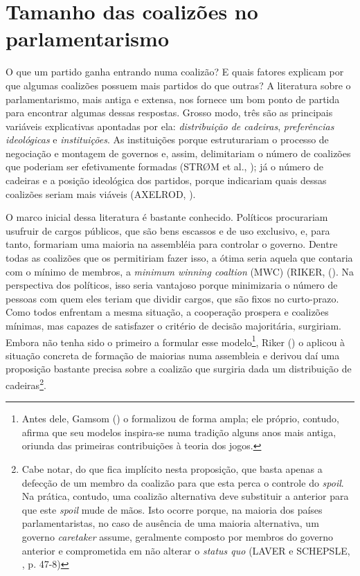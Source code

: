 \section{Tamanho das coalizões no parlamentarismo}

O que um partido ganha entrando numa coalizão? E quais fatores explicam por que algumas coalizões possuem mais partidos do que outras? A literatura sobre o parlamentarismo, mais antiga e extensa, nos fornece um bom ponto de partida para encontrar algumas dessas respostas. Grosso modo, três são as principais variáveis explicativas apontadas por ela: \textit{distribuição de cadeiras}, \textit{preferências ideológicas} e \textit{instituições}. As instituições porque estruturariam o processo de negociação e montagem de governos e, assim, delimitariam o número de coalizões que poderiam ser efetivamente formadas (STR\O{}M et al., \citeyear{strom1994}); já o número de cadeiras e a posição ideológica dos partidos, porque indicariam quais dessas coalizões seriam mais viáveis (AXELROD, \citeyear{axelrod1970}).

O marco inicial dessa literatura é bastante conhecido. Políticos procurariam usufruir de cargos públicos, que são bens escassos e de uso exclusivo, e, para tanto, formariam uma maioria na assembléia para controlar o governo. Dentre todas as coalizões que os permitiriam fazer isso, a ótima seria aquela que contaria com o mínimo de membros, a \textit{minimum winning coaltion} (MWC) (RIKER, (\citeyear{riker1962}). Na perspectiva dos políticos, isso seria vantajoso porque minimizaria o número de pessoas com quem eles teriam que dividir cargos, que são fixos no curto-prazo. Como todos enfrentam a mesma situação, a cooperação prospera e coalizões mínimas, mas capazes de satisfazer o critério de decisão majoritária, surgiriam. Embora não tenha sido o primeiro a formular esse modelo\footnote{Antes dele, Gamsom (\citeyear{gamson1961}) o formalizou de forma ampla; ele próprio, contudo, afirma que seu modelos inspira-se numa tradição alguns anos mais antiga, oriunda das primeiras contribuições à teoria dos jogos.}, Riker (\citeyear{riker1962}) o aplicou à situação concreta de formação de maiorias numa assembleia e derivou daí uma proposição bastante precisa sobre a coalizão que surgiria dada um distribuição de cadeiras\footnote{Cabe notar, do que fica implícito nesta proposição, que basta apenas a defecção de um membro da coalizão para que esta perca o controle do \textit{spoil}. Na prática, contudo, uma coalizão alternativa deve substituir a anterior para que este \textit{spoil} mude de mãos. Isto ocorre porque, na maioria dos países parlamentaristas, no caso de ausência de uma maioria alternativa, um governo \textit{caretaker} assume, geralmente composto por membros do governo anterior e comprometida em não alterar o \textit{status quo} (LAVER e SCHEPSLE, \citeyear{laver1996}, p. 47-8)}.

